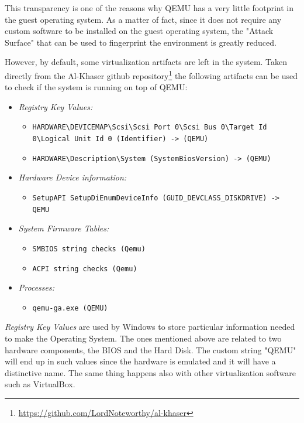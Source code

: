 This transparency is one of the reasons why QEMU has a very little footprint in the guest operating system. As a matter of fact, since it does not require any custom software to be installed on the guest operating system, the "Attack Surface" that can be used to fingerprint the environment is greatly reduced. 

However, by default, some virtualization artifacts are left in the system. Taken directly from the Al-Khaser github repository\footnote{\url{https://github.com/LordNoteworthy/al-khaser}} the following artifacts can be used to check if the system is running on top of QEMU:

\begin{itemize}
    \item \textit{Registry Key Values:}
    \begin{itemize}
        \item \lstinline{HARDWARE\DEVICEMAP\Scsi\Scsi Port 0\Scsi Bus 0\Target Id 0\Logical Unit Id 0 (Identifier) -> (QEMU)}
    \item \lstinline{HARDWARE\Description\System (SystemBiosVersion) -> (QEMU)} 
    \end{itemize}
    
    \item \textit{Hardware Device information:}
    \begin{itemize}
        \item \lstinline{SetupAPI SetupDiEnumDeviceInfo (GUID_DEVCLASS_DISKDRIVE) -> QEMU} 
    \end{itemize}
    
    \item \textit{System Firmware Tables:}
    \begin{itemize}
        \item \lstinline{SMBIOS string checks (Qemu)}
        \item \lstinline{ACPI string checks (Qemu)}
    \end{itemize}
    
    \item \textit{Processes:}
    \begin{itemize}
        \item \lstinline{qemu-ga.exe (QEMU)}
    \end{itemize}
\end{itemize}

\textit{Registry Key Values} are used by Windows to store particular information needed to make the Operating System. The ones mentioned above are related to two hardware components, the BIOS and the Hard Disk. The custom string "QEMU" will end up in such values since the hardware is emulated and it will have a distinctive name. The same thing happens also with other virtualization software such as VirtualBox.

